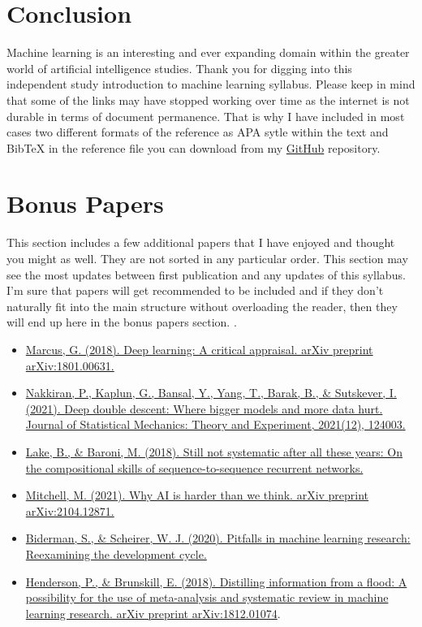 \documentclass{article}
\begin{document}
\section{Conclusion}
Machine learning is an interesting and ever expanding domain within the greater world of artificial intelligence studies. Thank you for digging into this independent study introduction to machine learning syllabus. Please keep in mind that some of the links may have stopped working over time as the internet is not durable in terms of document permanence. That is why I have included in most cases two different formats of the reference as APA sytle within the text and BibTeX in the reference file you can download from my \href{https://github.com/nelslindahlx/Introduction-to-machine-learning-syllabus-2022}{GitHub} repository. 

\section{Bonus Papers}
This section includes a few additional papers that I have enjoyed and thought you might as well. They are not sorted in any particular order. This section may see the most updates between first publication and any updates of this syllabus. I’m sure that papers will get recommended to be included and if they don’t naturally fit into the main structure without overloading the reader, then they will end up here in the bonus papers section. .

\begin{itemize}
\item \href{https://arxiv.org/ftp/arxiv/papers/1801/1801.00631.pdf}{Marcus, G. (2018). Deep learning: A critical appraisal. arXiv preprint arXiv:1801.00631.} \cite{marcus2018deep}
\item \href{https://arxiv.org/pdf/1912.02292.pdf}{Nakkiran, P., Kaplun, G., Bansal, Y., Yang, T., Barak, B., \& Sutskever, I. (2021). Deep double descent: Where bigger models and more data hurt. Journal of Statistical Mechanics: Theory and Experiment, 2021(12), 124003.} \cite{nakkiran2021deep} 
\item \href{https://openreview.net/pdf?id=H18WqugAb}{Lake, B., \& Baroni, M. (2018). Still not systematic after all these years: On the compositional skills of sequence-to-sequence recurrent networks.} \cite{lake2018still}
\item \href{https://arxiv.org/pdf/2104.12871.pdf}{Mitchell, M. (2021). Why AI is harder than we think. arXiv preprint arXiv:2104.12871.} \cite{mitchell2021ai} 
\item \href{http://proceedings.mlr.press/v137/biderman20a/biderman20a.pdf}{Biderman, S., \& Scheirer, W. J. (2020). Pitfalls in machine learning research: Reexamining the development cycle.} \cite{biderman2020pitfalls} 
\item \href{https://arxiv.org/pdf/1812.01074.pdf}{Henderson, P., \& Brunskill, E. (2018). Distilling information from a flood: A possibility for the use of meta-analysis and systematic review in machine learning research. arXiv preprint arXiv:1812.01074}. \cite{henderson2018distilling}
\end{itemize}
\end{document}
